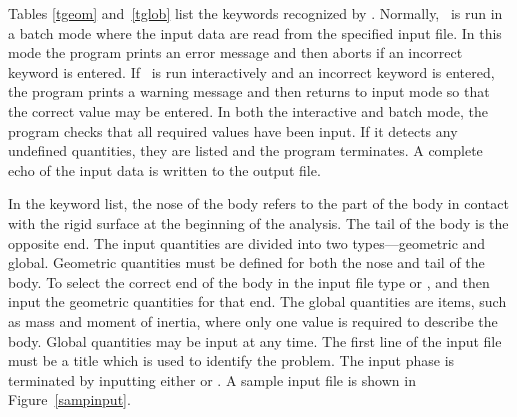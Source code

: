 Tables \ref{tgeom} and~\ref{tglob} list the keywords recognized by
\SLAP. Normally, \SLAP\  is run in a batch mode where the input data are
read from the specified input file.  In this mode the program prints an
error message and then aborts if an incorrect keyword is entered. If
\SLAP\ is run interactively and an incorrect keyword is entered, the
program prints a warning message and then returns to input mode so that
the correct value may be entered.  In both the interactive and batch
mode, the program checks that all required values have been input.  If
it detects any undefined quantities, they are listed and the program
terminates. A complete echo of the input data is written to the output
file. 

In the keyword list, the nose of the body refers to the part
of the body in contact with the rigid surface at the beginning of the
analysis. The tail of the body is the opposite end.  The input
quantities are divided into two types---geometric and global.
Geometric quantities must be defined for both the nose and tail of the
body. To select the correct end of the body in the input file type
 or , and then input the geometric quantities for
that end.  The global quantities are items, such as mass and moment of
inertia, where only one value is required to describe the body.  Global
quantities may be input at any time.  The first line of the input file
must be a title which is used to identify the problem.  The input phase
is terminated by inputting either  or .  A sample
input file is shown in Figure~\ref{sampinput}. 
